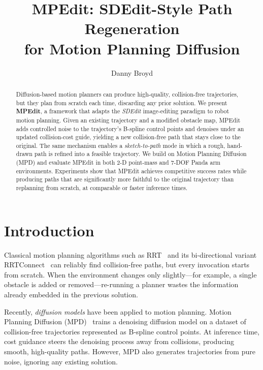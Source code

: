 \documentclass[12pt]{article}
\title{\textbf{MPEdit: SDEdit-Style Path Regeneration\\for Motion Planning Diffusion}}
\author{Danny Broyd}
\date{}
\begin{document}
\maketitle

\begin{abstract}
Diffusion-based motion planners can produce high-quality, collision-free
trajectories, but they plan from scratch each time, discarding any prior
solution.  We present \textbf{MPEdit}, a framework that adapts the
\emph{SDEdit} image-editing paradigm to robot motion planning.  Given an
existing trajectory and a modified obstacle map, MPEdit adds controlled noise
to the trajectory's B-spline control points and denoises under an updated
collision-cost guide, yielding a new collision-free path that stays close to
the original.  The same mechanism enables a \emph{sketch-to-path} mode in
which a rough, hand-drawn path is refined into a feasible trajectory.
We build on Motion Planning Diffusion (MPD) and evaluate MPEdit in both 2-D
point-mass and 7-DOF Panda arm environments.  Experiments show that MPEdit
achieves competitive success rates while producing paths that are
significantly more faithful to the original trajectory than replanning from
scratch, at comparable or faster inference times.
\end{abstract}

\section{Introduction}
\label{sec:intro}

Classical motion planning algorithms such as RRT~\cite{lavalle1998rrt} and
its bi-directional variant RRTConnect~\cite{kuffner2000rrtconnect} can
reliably find collision-free paths, but every invocation starts from scratch.
When the environment changes only slightly---for example, a single obstacle
is added or removed---re-running a planner wastes the information already
embedded in the previous solution.

Recently, \emph{diffusion models} have been applied to motion planning.
Motion Planning Diffusion (MPD)~\cite{carvalho2023mpd} trains a denoising
diffusion model on a dataset of collision-free trajectories represented as
B-spline control points.  At inference time, cost guidance steers the
denoising process away from collisions, producing smooth, high-quality paths.
However, MPD also generates trajectories from pure noise, ignoring any
existing solution.
\end{document}
